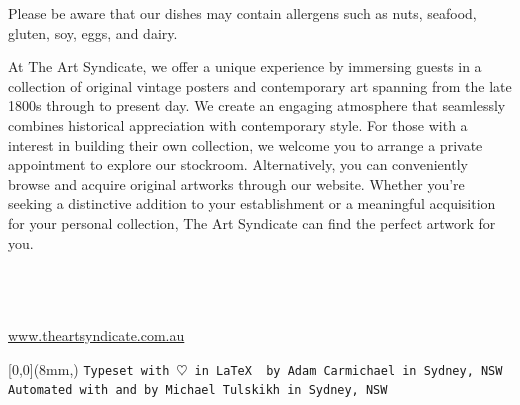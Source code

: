 \documentclass[
    pdflatex,
    fontsize=8pt,
    draft=true,
    twoside
]{article}
\begin{document}
\newpage




\newpage


\newpage

Please be aware that our dishes may contain allergens such as nuts,
seafood, gluten, soy, eggs, and dairy.

\newpage
At The Art Syndicate, we offer a unique experience by immersing guests in a collection of original vintage posters and contemporary art spanning from the late 1800s through to present day. We create an engaging atmosphere that seamlessly combines historical appreciation with contemporary style. For those with a interest in building their own collection, we welcome you to arrange a private appointment to explore our stockroom. Alternatively, you can conveniently browse and acquire original artworks through our website. Whether you're seeking a distinctive addition to your establishment or a meaningful acquisition for your personal collection, The Art Syndicate can find the perfect artwork for you.
\\~\\
\begin{center}
    \\~\\
    \url{www.theartsyndicate.com.au}
\end{center}
\fancyfoot[R]{\footnotesize\DTMnow}
\begin{textblock*}{\linewidth}[0,0](8mm,\dimexpr\paperheight-20mm\relax)
    \footnotesize{
        \texttt{Typeset with $\heartsuit$ in \LaTeX~ by Adam Carmichael in Sydney, NSW}
    }\\
    \footnotesize{
        \texttt{Automated with  and  by Michael Tulskikh in Sydney, NSW}
    }
\end{textblock*}
\end{document}
